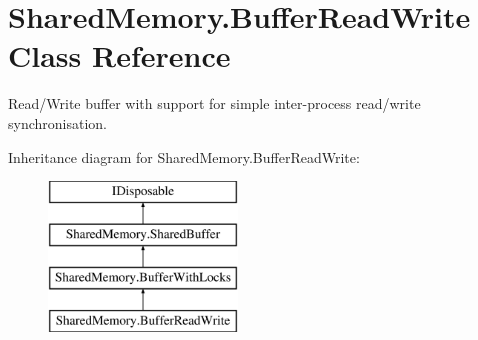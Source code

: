 \hypertarget{class_shared_memory_1_1_buffer_read_write}{}\section{Shared\+Memory.\+Buffer\+Read\+Write Class Reference}
\label{class_shared_memory_1_1_buffer_read_write}


Read/\+Write buffer with support for simple inter-\/process read/write synchronisation.  


Inheritance diagram for Shared\+Memory.\+Buffer\+Read\+Write\+:\begin{figure}[H]
\begin{center}
\leavevmode
\includegraphics[height=4.000000cm]{class_shared_memory_1_1_buffer_read_write}
\end{center}
\end{figure}
